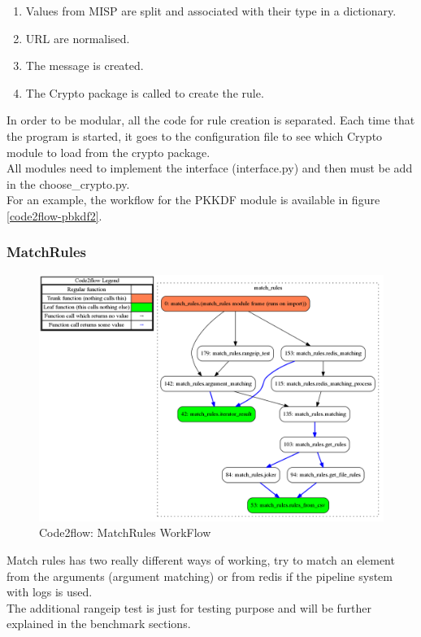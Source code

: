 \documentclass{eplmastersthesis}
\begin{document}
\begin{enumerate}
\item Values from MISP are split and associated with their type in a dictionary.
\item URL are normalised.
\item The message is created.
\item The Crypto package is called to create the rule.
\end{enumerate}

In order to be modular, all the code for rule creation is separated. Each time that the program is started, it goes to the configuration file to see which Crypto module to load from the crypto package.\\
All modules need to implement the interface (interface.py) and then must be add in the choose\_crypto.py.\\
For an example, the workflow for the PKKDF module is available in figure \ref{code2flow-pbkdf2}.

\subsubsection{MatchRules}
\begin{figure}[h!]
\begin{center}
	\includegraphics[scale=0.3]{res/flowMatchRules}
	\caption{Code2flow: MatchRules WorkFlow}
	\label{code2flow-matchRules}
\end{center}
\end{figure}

Match rules has two really different ways of working, try to match an element from the arguments (argument matching) or from redis if the pipeline system with logs is used.\\
The additional rangeip test is just for testing purpose and will be further explained in the benchmark sections.\\
\end{document}
